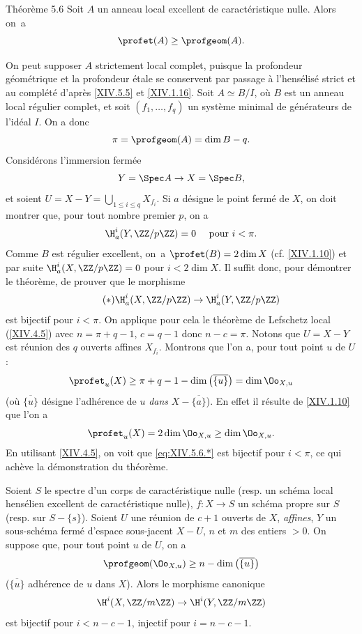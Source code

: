 \label{XIV.5.6}
\begin{enonce*}{Th\'eor\`eme 5.6\ndemark}
Soit $A$ un anneau local excellent de caract\'eristique nulle. Alors on~a
$$
\profet(A)\geq\profgeom(A).
$$
\end{enonce*}

On peut supposer $A$ strictement local complet, puisque la profondeur g\'eom\'etrique et la profondeur \'etale se conservent par passage \`a l'hens\'elis\'e strict et au compl\'et\'e d'apr\`es \ref{XIV.5.5} et \ref{XIV.1.16}. Soit $A\simeq B/I$, o\`u $B$ est un anneau local r\'egulier complet, et soit $(f_{1},\dots, f_{q})$ un syst\`eme minimal de g\'en\'erateurs de l'id\'eal $I$. On a donc
$$
\pi=\profgeom(A)=\dim B-q.
$$
Consid\'erons l'immersion ferm\'ee
$$Y=\Spec A\to X=\Spec B,
$$
et soient $U=X-Y=\bigcup_{1\leq i\leq q}X_{f_{i}}$. Si $a$ d\'esigne le point ferm\'e de $X$, on doit montrer que, pour tout nombre premier $p$, on a
$$
\H_{a}^{i}(Y, \ZZ/p\ZZ)=0\quad\textrm{ pour }i<\pi.
$$
Comme $B$ est r\'egulier excellent, on~a $\profet(B)=2\dim X$ (cf. \ref{XIV.1.10}) et par suite $\H_{a}^{i}(X, \ZZ/p\ZZ)=0$ pour $i<2\dim X$. Il suffit donc, pour d\'emontrer le th\'eor\`eme, de prouver que le morphisme
\begin{equation*} \label{eq:XIV.5.6.*} \tag{$*$}
\H_{a}^{i}(X, \ZZ/p\ZZ)\to\H_{a}^{i}(Y, \ZZ/p\ZZ)
\end{equation*}
est bijectif pour $i<\pi$. On applique pour cela le th\'eor\`eme de Lefschetz local (\ref{XIV.4.5}) avec $n=\pi+q-1$, $c=q-1$ donc $n-c=\pi$. Notons que $U=X-Y$ est r\'eunion des $q$ ouverts affines $X_{f_{i}}$. Montrons que l'on a, pour tout point $u$ de $U$:
$$
\profet_{u}(X)\geq\pi+q-1-\dim\big(\overline{\{ u\} }\big)=\dim\Oo_{X, u}$$
(o\`u $\overline{\{ u\} }$ d\'esigne l'adh\'erence de $u$ \emph{dans} $X-\overline{\{ a\} }$). En effet il r\'esulte de \ref{XIV.1.10} que l'on a
$$
\profet_{u}(X)=2\dim\Oo_{X, u}\geq\dim\Oo_{X, u}.
$$
En utilisant \ref{XIV.4.5}, on voit que \eqref{eq:XIV.5.6.*} est bijectif pour $i<\pi$, ce qui ach\`eve la d\'emonstration du th\'eor\`eme.

\begin{corollaire} \label{XIV.5.7} Soient $S$ le spectre d'un corps de caract\'eristique nulle (resp. un sch\'ema local hens\'elien excellent de caract\'eristique nulle), $f\colon X\to S$ un sch\'ema propre sur $S$ (resp. sur $S-\{ s\}$). Soient $U$ une r\'eunion de $c+1$ ouverts de $X$, \emph{affines}, $Y$ un sous-sch\'ema ferm\'e d'espace sous-jacent $X-U$, $n$ et $m$ des entiers $>0$. On suppose que, pour tout point $u$ de $U$, on a
$$
\profgeom(\Oo_{X, u})\geq n-\dim\big(\overline{\{ u\} }\big)$$
($\overline{\{ u\} }$ adh\'erence de $u$ dans $X$). Alors le morphisme canonique
$$
\H^{i}(X, \ZZ/m\ZZ)\to\H^{i}(Y, \ZZ/m\ZZ)$$
est bijectif pour $i<n-c-1$, injectif pour $i=n-c-1$.
\end{corollaire}

